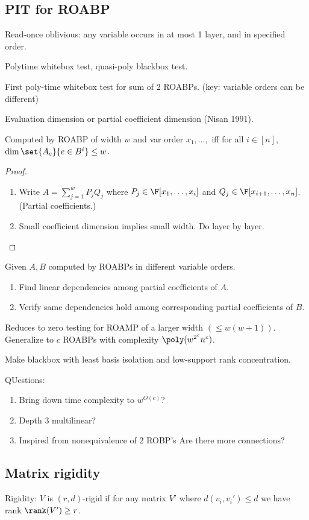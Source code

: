 \subsection{PIT for ROABP}

Read-once oblivious: any variable occurs in at most 1 layer, and in specified order.

Polytime whitebox test, quasi-poly blackbox test.

First poly-time whitebox test for sum of 2 ROABPs. (key: variable orders can be different)

Evaluation dimension or partial coefficient dimension (Nisan 1991). %

Computed by ROABP of width $w$ and var order $x_1,\ldots, $ iff for all $i\in [n]$, $\dim\set{A_e}{e\in B^i}\le w$.
\begin{proof}
\begin{enumerate}
\item
Write $A=\sum_{j=1}^w P_jQ_j$ where $P_j\in \F[x_1,\ldots, x_i]$ and $Q_j\in \F[x_{i+1},\ldots, x_n]$. (Partial coefficients.)

\item
Small coefficient dimension implies small width. Do layer by layer.
\end{enumerate}
\end{proof}

Given $A,B$ computed by ROABPs in different variable orders.
\begin{enumerate}
\item
Find linear dependencies among partial coefficients of $A$.
\item
Verify same dependencies hold among corresponding partial coefficients of $B$.
\end{enumerate}
Reduces to zero testing for ROAMP of a larger width $(\le w(w+1))$.
Generalize to $c$ ROABPs with complexity $\poly(w^{2^c}n^c)$. 

Make blackbox with least basis isolation and low-support rank concentration.

QUestions:
\begin{enumerate}
\item
Bring down time complexity to $w^{O(c)}$? 
\item Depth 3 multilinear? 
\item Inspired from nonequivalence of 2 ROBP's Are there more connections?
\end{enumerate}

\subsection{Matrix rigidity}
Rigidity: $V$ is $(r,d)$-rigid if for any matrix $V'$ where $d(v_i,v_i')\le d$ we have rank $\rank(V')\ge r$.

